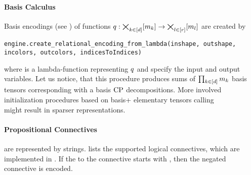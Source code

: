 \paragraph{Basis Calculus}
Basis encodings (see ) of functions $q:\bigtimes_{k\in[d]}[m_{k}] \rightarrow \bigtimes_{l\in[r]}[m_{l}]$ are created by
\begin{lstlisting}
engine.create_relational_encoding_from_lambda(inshape, outshape, incolors, outcolors, indicesToIndices)
\end{lstlisting}
where  is a lambda-function representing $q$ and  specify the input and output variables.
Let us notice, that this procedure produces sums of $\prod_{k\in[d]}m_{k}$ basis tensors corresponding with a basis $\mathrm{CP}$ decompositions.
More involved initialization procedures based on basis+ elementary tensors calling \\
 might result in sparser representations.

\paragraph{Propositional Connectives} are represented by strings.
 lists the supported logical connectives, which are implemented in .
If the  to the connective starts with , then the negated connective is encoded.

